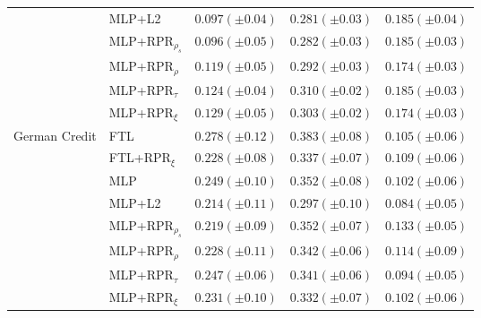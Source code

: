 \begin{tabular}{lllll}
 & MLP+L2 & $0.097 (\pm0.04)$ & $0.281 (\pm0.03)$ & $0.185 (\pm0.04)$ \\
 & MLP+RPR$_{\rho_s}$ & $0.096 (\pm0.05)$ & $0.282 (\pm0.03)$ & $0.185 (\pm0.03)$ \\
 & MLP+RPR$_{\rho}$ & $0.119 (\pm0.05)$ & $0.292 (\pm0.03)$ & $0.174 (\pm0.03)$ \\
 & MLP+RPR$_{\tau}$ & $0.124 (\pm0.04)$ & $0.310 (\pm0.02)$ & $0.185 (\pm0.03)$ \\
 & MLP+RPR$_{\xi}$ & $0.129 (\pm0.05)$ & $0.303 (\pm0.02)$ & $0.174 (\pm0.03)$ \\
\cline{1-5}
\multirow[t]{8}{*}{German Credit} & FTL & $0.278 (\pm0.12)$ & $0.383 (\pm0.08)$ & $0.105 (\pm0.06)$ \\
 & FTL+RPR$_{\xi}$ & $0.228 (\pm0.08)$ & $0.337 (\pm0.07)$ & $0.109 (\pm0.06)$ \\
 & MLP & $0.249 (\pm0.10)$ & $0.352 (\pm0.08)$ & $0.102 (\pm0.06)$ \\
 & MLP+L2 & $0.214 (\pm0.11)$ & $0.297 (\pm0.10)$ & $0.084 (\pm0.05)$ \\
 & MLP+RPR$_{\rho_s}$ & $0.219 (\pm0.09)$ & $0.352 (\pm0.07)$ & $0.133 (\pm0.05)$ \\
 & MLP+RPR$_{\rho}$ & $0.228 (\pm0.11)$ & $0.342 (\pm0.06)$ & $0.114 (\pm0.09)$ \\
 & MLP+RPR$_{\tau}$ & $0.247 (\pm0.06)$ & $0.341 (\pm0.06)$ & $0.094 (\pm0.05)$ \\
 & MLP+RPR$_{\xi}$ & $0.231 (\pm0.10)$ & $0.332 (\pm0.07)$ & $0.102 (\pm0.06)$ \\
\cline{1-5}
\bottomrule
\end{tabular}
